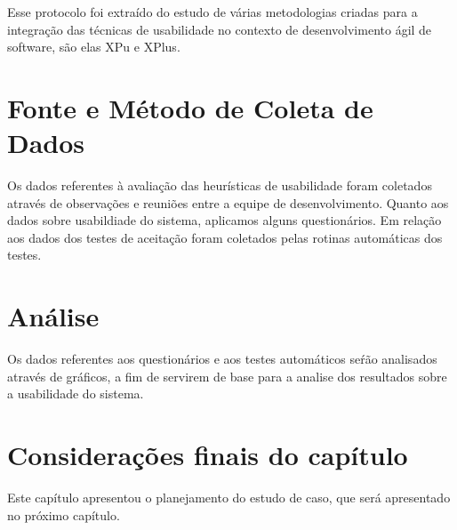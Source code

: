 Esse protocolo foi extraído do estudo de várias metodologias criadas para a integração das técnicas de usabilidade no contexto de desenvolvimento ágil de software, são elas XPu e XPlus.
 
 


	

\section{Fonte e Método de Coleta de Dados}

Os dados referentes à avaliação das heurísticas de usabilidade foram coletados através de observações e reuniões entre a equipe de desenvolvimento. Quanto aos dados sobre usabildiade do sistema, aplicamos alguns questionários. Em relação aos dados dos testes de aceitação foram coletados pelas rotinas automáticas dos testes.


\section{Análise}

Os dados referentes aos questionários e aos testes automáticos seŕão analisados através de gráficos, a fim de servirem de base para a analise dos resultados sobre a usabilidade do sistema.

\section{Considerações finais do capítulo}

Este capítulo apresentou o planejamento do estudo de caso, que será apresentado no próximo capítulo.